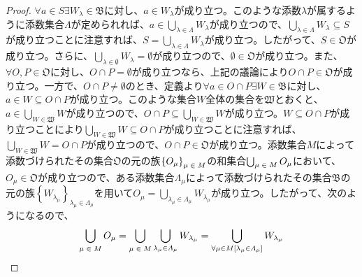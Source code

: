 \documentclass[dvipdfmx]{jsarticle}
\begin{document}
\begin{proof}
$\forall a \in S\exists W_{\lambda}\in \mathfrak{B}$に対し、$a \in W_{\lambda}$が成り立つ。このような添数$\lambda$が属するように添数集合$\varLambda$が定められれば、$a \in \bigcup_{\lambda \in \varLambda} W_{\lambda}$が成り立つので、$\bigcup_{\lambda \in \varLambda} W_{\lambda} \subseteq S$が成り立つことに注意すれば、$S = \bigcup_{\lambda \in \varLambda} W_{\lambda}$が成り立つ。したがって、$S \in \mathfrak{O}$が成り立つ。さらに、$\bigcup_{\lambda \in \emptyset} W_{\lambda} = \emptyset$が成り立つので、$\mathfrak{\emptyset \in O}$が成り立つ。また、$\forall O,P \in \mathfrak{O}$に対し、$O \cap P = \emptyset$が成り立つなら、上記の議論により$O \cap P\in \mathfrak{O}$が成り立つ。一方で、$O \cap P \neq \emptyset$のとき、定義より$\forall a \in O \cap P\exists W \in \mathfrak{B}$に対し、$a \in W \subseteq O \cap P$が成り立つ。このような集合$W$全体の集合を$\mathfrak{W}$とおくと、$a \in \bigcup_{W \in \mathfrak{W}} W$が成り立つので、$O \cap P \subseteq \bigcup_{W \in \mathfrak{W}} W$が成り立つ。$W \subseteq O \cap P$が成り立つことにより$\bigcup_{W \in \mathfrak{W}} W \subseteq O \cap P$が成り立つことに注意すれば、$\bigcup_{W \in \mathfrak{W}} W = O \cap P$が成り立つので、$O \cap P \in \mathfrak{O}$が成り立つ。添数集合$M$によって添数づけられたその集合$\mathfrak{O}$の元の族$\left\{ O_{\mu} \right\}_{\scriptsize \begin{matrix}
\mu \in M \\
\end{matrix}}$の和集合$\bigcup_{\scriptsize \begin{matrix}
\mu \in M \\
\end{matrix}} O_{\mu}$において、$O_{\mu}\in \mathfrak{O}$が成り立つので、ある添数集合$\varLambda_{\mu}$によって添数づけられたその集合$\mathfrak{B}$の元の族$\left\{ W_{\lambda_{\mu}} \right\}_{\lambda_{\mu} \in \varLambda_{\mu}}$を用いて$O_{\mu} = \bigcup_{\lambda_{\mu} \in \varLambda_{\mu}} W_{\lambda_{\mu}}$が成り立つ。したがって、次のようになるので、
\begin{align*}
\bigcup_{\scriptsize \begin{matrix}
\mu \in M \\
\end{matrix}} O_{\mu} = \bigcup_{\scriptsize \begin{matrix}
\mu \in M \\
\end{matrix}} {\bigcup_{\lambda_{\mu} \in \varLambda_{\mu}} W_{\lambda_{\mu}}} = \bigcup_{\forall\mu \in M\left[ \lambda_{\mu} \in \varLambda_{\mu} \right]} W_{\lambda_{\mu}}

\end{align*}
\end{proof}
\end{document}
